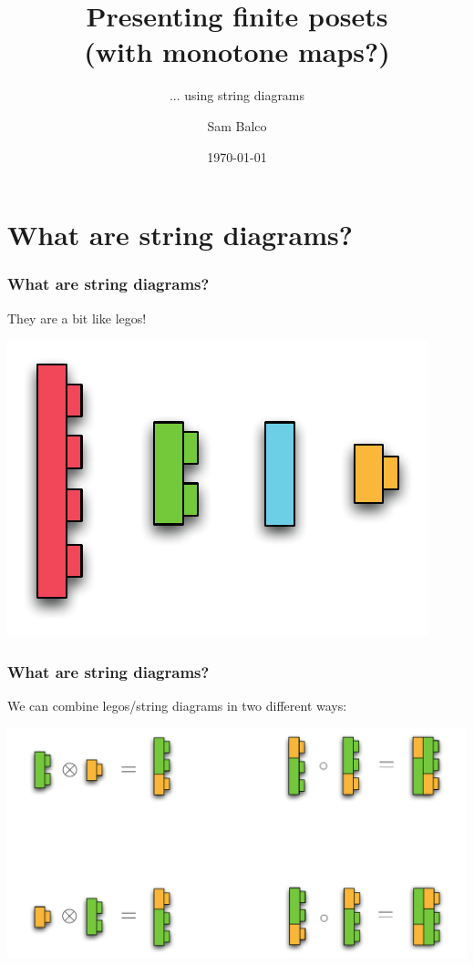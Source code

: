\documentclass[t, pdftex]{beamer}
\title{Presenting finite posets \\(with monotone maps?)}
\subtitle{... using string diagrams}
\author{Sam Balco}
\date{\today}
\begin{document}
\titleframe


\section{What are string diagrams?}

\begin{frame}
    \frametitle{What are string diagrams?}
    They are a bit like legos!
    \begin{center}
        \includegraphics{figures/lego.pdf}
    \end{center}
\end{frame}

\begin{frame}
    \frametitle{What are string diagrams?}
    We can combine legos/string diagrams in two different ways:
    \begin{center}
        \includegraphics[width=\textwidth,keepaspectratio]{figures/lego2.pdf}
    \end{center}
\end{frame}
\end{document}
